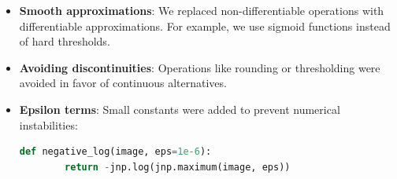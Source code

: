 \documentclass[nomenclature, english, bibtex]{kththesis}
\numberwithin{listing}{chapter}
\begin{document}
\begin{itemize}
    \item \textbf{Smooth approximations}: We replaced non-differentiable operations with differentiable approximations. For example, we use sigmoid functions instead of hard thresholds.

    \item \textbf{Avoiding discontinuities}: Operations like rounding or thresholding were avoided in favor of continuous alternatives.

    \item \textbf{Epsilon terms}: Small constants were added to prevent numerical instabilities:
    \begin{lstlisting}[language=Python]
    def negative_log(image, eps=1e-6):
        return -jnp.log(jnp.maximum(image, eps))
    \end{lstlisting}
\end{itemize}





\end{document}

